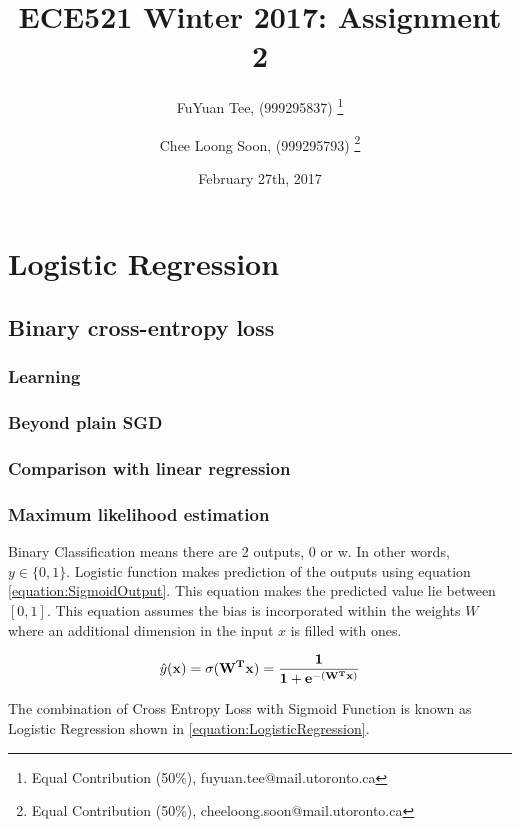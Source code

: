 \documentclass[a4paper,12pt]{article}
\title{ECE521 Winter 2017: Assignment 2}
\author{FuYuan Tee, (999295837)
  \thanks{Equal Contribution (50\%), fuyuan.tee@mail.utoronto.ca}
\and Chee Loong Soon, (999295793) \thanks{Equal Contribution (50\%),  cheeloong.soon@mail.utoronto.ca}}
\date{February 27th, 2017}
\begin{document}
\maketitle
\tableofcontents
\clearpage
\section{Logistic Regression}
\subsection{Binary cross-entropy loss}
\subsubsection{Learning}

\clearpage
\subsubsection{Beyond plain SGD}

\clearpage
\subsubsection{Comparison with linear regression}

\clearpage
\subsubsection{Maximum likelihood estimation}
Binary Classification means there are 2 outputs, 0 or w. In other words, $y \in \{0,1\}$. 
Logistic function  makes prediction of the outputs using equation \ref{equation:SigmoidOutput}. This equation makes the predicted value lie between $[0,1]$. 
This equation assumes the bias is incorporated within the weights $W$ where an additional dimension in the input $x$ is filled with ones. 

\begin{equation}
\label{equation:SigmoidOutput}
\hat{y}(\bf{x}) = \sigma(W^{T}\mathbf{x}) = \frac{1}{1+e^{-(W^{T}\mathbf{x})}}
\end{equation}


The combination of Cross Entropy Loss with Sigmoid Function is known as Logistic Regression shown in \ref{equation:LogisticRegression}. 
\end{document}
